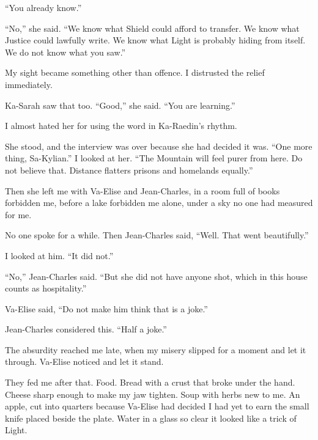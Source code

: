 ``You already know.''\par

``No,'' she said. ``We know what Shield could afford to transfer. We know what Justice could lawfully write. We know what Light is probably hiding from itself. We do not know what you saw.''\par

My sight became something other than offence. I distrusted the relief immediately.\par

Ka-Sarah saw that too. ``Good,'' she said. ``You are learning.''\par

I almost hated her for using the word in Ka-Raedin's rhythm.\par

She stood, and the interview was over because she had decided it was. ``One more thing, Sa-Kylian.'' I looked at her. ``The Mountain will feel purer from here. Do not believe that. Distance flatters prisons and homelands equally.''\par

Then she left me with Va-Elise and Jean-Charles, in a room full of books forbidden me, before a lake forbidden me alone, under a sky no one had measured for me.\par

No one spoke for a while. Then Jean-Charles said, ``Well. That went beautifully.''\par

I looked at him. ``It did not.''\par

``No,'' Jean-Charles said. ``But she did not have anyone shot, which in this house counts as hospitality.''\par

Va-Elise said, ``Do not make him think that is a joke.''\par

Jean-Charles considered this. ``Half a joke.''\par

The absurdity reached me late, when my misery slipped for a moment and let it through. Va-Elise noticed and let it stand.\par

They fed me after that. Food. Bread with a crust that broke under the hand. Cheese sharp enough to make my jaw tighten. Soup with herbs new to me. An apple, cut into quarters because Va-Elise had decided I had yet to earn the small knife placed beside the plate. Water in a glass so clear it looked like a trick of Light.\par


